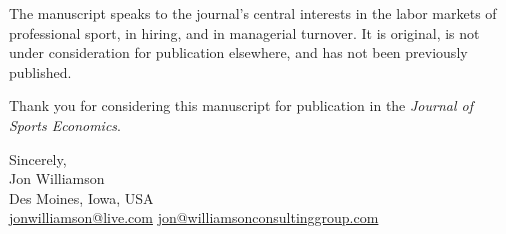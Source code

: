 \documentclass[12pt,USenglish]{article}
\begin{document}
The manuscript speaks to the journal's central interests in the labor markets of professional sport, in hiring, and in managerial turnover. It is original, is not under consideration for publication elsewhere, and has not been previously published.

Thank you for considering this manuscript for publication in the \emph{Journal of Sports Economics}.

\bigskip

Sincerely,\\
Jon Williamson\\
Des Moines, Iowa, USA\\
\href{mailto:jonwilliamson@live.com}{jonwilliamson@live.com} \quad \href{mailto:jon@williamsonconsultinggroup.com}{jon@williamsonconsultinggroup.com}
\end{document}
